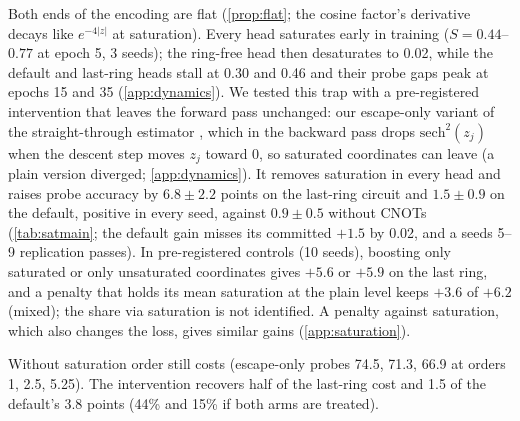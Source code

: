Both ends of the encoding are flat (\cref{prop:flat}; the cosine factor's derivative decays like $e^{-4|z|}$ at saturation). Every
head saturates early in training ($S=0.44$--$0.77$ at epoch 5, 3 seeds); the ring-free head then
desaturates to 0.02, while the default and last-ring heads stall at 0.30 and 0.46 and their probe gaps
peak at epochs 15 and 35 (\cref{app:dynamics}). We tested this trap with a pre-registered intervention
that leaves the forward pass unchanged: our escape-only variant of the straight-through estimator \citep{bengio2013}, which in the backward
pass drops $\mathrm{sech}^2(z_j)$ when the descent step moves $z_j$ toward 0, so saturated
coordinates can leave (a plain version diverged; \cref{app:dynamics}). It removes saturation in every head and raises
probe accuracy by $6.8\pm2.2$ points on the last-ring circuit and $1.5\pm0.9$ on the default, positive
in every seed, against $0.9\pm0.5$ without CNOTs (\cref{tab:satmain}; the default gain misses its committed $+1.5$ by 0.02, and a
seeds 5--9 replication passes). In pre-registered controls (10 seeds), boosting only saturated or only unsaturated coordinates gives $+5.6$ or $+5.9$ on the last ring, and a penalty that holds its mean saturation at the plain level keeps $+3.6$ of $+6.2$ (mixed); the share via saturation is not identified. A penalty against saturation, which also changes the loss, gives similar
gains (\cref{app:saturation}).

Without saturation order still costs (escape-only probes 74.5, 71.3, 66.9 at orders 1, 2.5, 5.25). The intervention recovers half of the last-ring cost and 1.5 of the default's 3.8 points (44\% and 15\% if both arms are treated).
